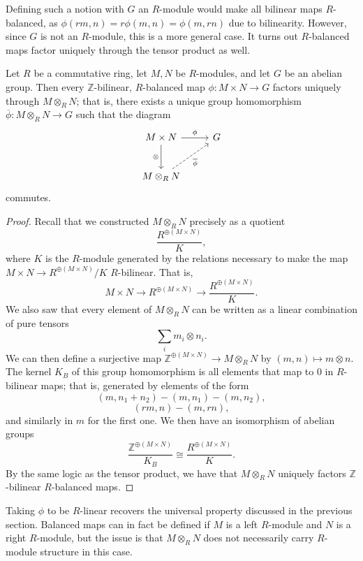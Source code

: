 Defining such a notion with $G$ an $R$-module would make all bilinear maps $R$-balanced, as $\phi (r m,n)=r\phi (m,n)=\phi (m,rn)$ due to bilinearity. However, since $G$ is not an $R$-module, this is a more general case. It turns out $R$-balanced maps factor uniquely through the tensor product as well.
\begin{lemma}\label{lma:8.4}
	Let $R$ be a commutative ring, let $M,N$ be $R$-modules, and let $G$ be an abelian group. Then every $\mathbb{Z} $-bilinear, $R$-balanced map $\phi : M\times N \to G$ factors uniquely through $M\otimes_R N$; that is, there exists a unique group homomorphism $\overline{\phi } : M\otimes_R N \to G$ such that the diagram
	\[\begin{tikzcd}[row sep = 2.5em, column sep = 2.5em]
		M\times N\arrow[r, "\phi "]\arrow[d, "\otimes "']&G\\
		M\otimes _RN\arrow[ru, dashed, " \overline{\phi } "']
	\end{tikzcd}\]
	commutes.
\end{lemma}
\begin{proof}
	Recall that we constructed $M\otimes _RN$ precisely as a quotient
	\[
		\frac{R^{\oplus (M\times N)} }{K} 
	,\]
	where $K$ is the $R$-module generated by the relations necessary to make the map $M\times N\to R^{\oplus (M\times N)} /K$ $R$-bilinear. That is,
	\[
		M\times N\to R^{\oplus (M\times N)} \to \frac{R^{\oplus (M\times N)} }{K} 
	.\]
	We also saw that every element of $M\otimes _RN$ can be written as a linear combination of pure tensors
	\[
		\sum_{i} m_i\otimes n_i
	.\]
	We can then define a surjective map $\mathbb{Z} ^{\oplus (M\times N)} \to M\otimes _RN$ by $(m,n)\mapsto m\otimes n$. The kernel $K_B$ of this group homomorphism is all elements that map to $0$ in $R$-bilinear maps; that is, generated by elements of the form
	\[
		(m,n_1+n_2)-(m,n_1)-(m,n_2)
	,\]
	\[
		(r m,n)-(m,rn)
	,\]
	and similarly in $m$ for the first one. We then have an isomorphism of abelian groups
	\[
		\frac{\mathbb{Z} ^{\oplus (M\times N)} }{K_B} \cong \frac{R^{\oplus (M\times N)} }{K} 
	.\]
	By the same logic as the tensor product, we have that $M\otimes_R N$ uniquely factors $\mathbb{Z}$-bilinear $R$-balanced maps.
\end{proof}

Taking $\phi $ to be $R$-linear recovers the universal property discussed in the previous section. Balanced maps can in fact be defined if $M$ is a left $R$-module and $N$ is a right $R$-module, but the issue is that $M\otimes _RN$ does not necessarily carry $R$-module structure in this case.

